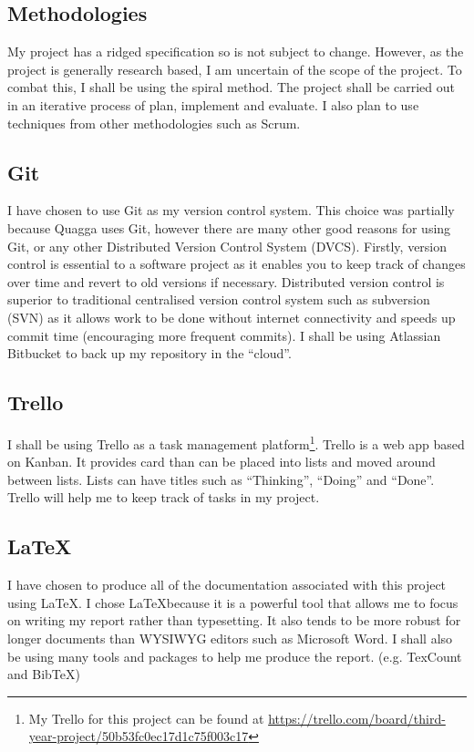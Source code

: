 \documentclass[12pt]{report}
\begin{document}
\subsection{Methodologies}
My project has a ridged specification so is not subject to change.
However, as the project is generally research based, I am uncertain of the scope
of the project. To combat this, I shall be using the spiral method. The project
shall be carried out in an iterative process of plan, implement and evaluate. I
also plan to use techniques from other methodologies such as Scrum. 

\subsection{Git}
I have chosen to use Git as my version control system. This choice was
partially because Quagga uses Git, however there are many other good reasons for
using Git, or any other Distributed Version Control System (DVCS).
 Firstly, version control
is essential to a software project as it enables you to keep track of changes
over time and revert to old versions if necessary. Distributed version control
is superior to traditional centralised version control system such as subversion
(SVN) as it allows work to be done without internet connectivity and speeds up
commit time (encouraging more frequent commits). I shall be using Atlassian
Bitbucket to back up my repository in the ``cloud''.

\subsection{Trello}
I shall be using Trello as a task management platform\footnote{My Trello  for
this project can be found at
\url{https://trello.com/board/third-year-project/50b53fc0ec17d1c75f003c17}}.
Trello is a web app based on Kanban. It provides card than can be placed into
lists and moved around between lists. Lists can have titles such as
``Thinking'', ``Doing'' and ``Done''. Trello will help me to keep track of tasks
in my project.

\subsection{\LaTeX} 
I have chosen to produce all of the documentation associated
with this project using \LaTeX. I chose \LaTeX because it is a
powerful tool that allows me to focus on writing my report rather than
typesetting. It also tends to be more robust for longer documents than WYSIWYG
editors such as Microsoft Word. I shall also be using many tools and packages to
help me produce the report. (e.g.  TexCount and BibTeX)
\end{document}
